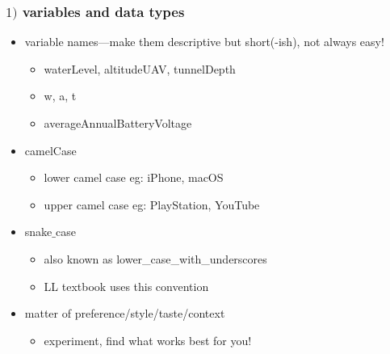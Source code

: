 \documentclass[14pt]{beamer}
\newcommand\red[1]{{\color{red} #1}}
\newcommand\green[1]{{\color{green} #1}}
\newcommand{\cmark}{\ding{51}}%
\newcommand{\xmark}{\ding{55}}%
\begin{document}
\begin{frame}[fragile]

\frametitle{$1)$ variables and data types}

\begin{itemize}
	\item variable names---make them descriptive but short(-ish), not always easy!
		\begin{itemize}
			\item[\green{\cmark}]  waterLevel, altitudeUAV, tunnelDepth
			\item[\red{\xmark}] w, a, t
			\item[\red{\xmark}] averageAnnualBatteryVoltage
		\end{itemize}
	\item camelCase
		\begin{itemize}
			\item lower camel case eg: iPhone, macOS
			\item upper camel case eg: PlayStation, YouTube
		\end{itemize}
	\item snake$\_$case
		\begin{itemize}
			\item also known as lower\_case\_with\_underscores
			\item LL textbook uses this convention
		\end{itemize}
	\item matter of preference/style/taste/context
		\begin{itemize}
			\item experiment, find what works best for you! %
		\end{itemize}
\end{itemize}

\end{frame}

\end{document}
